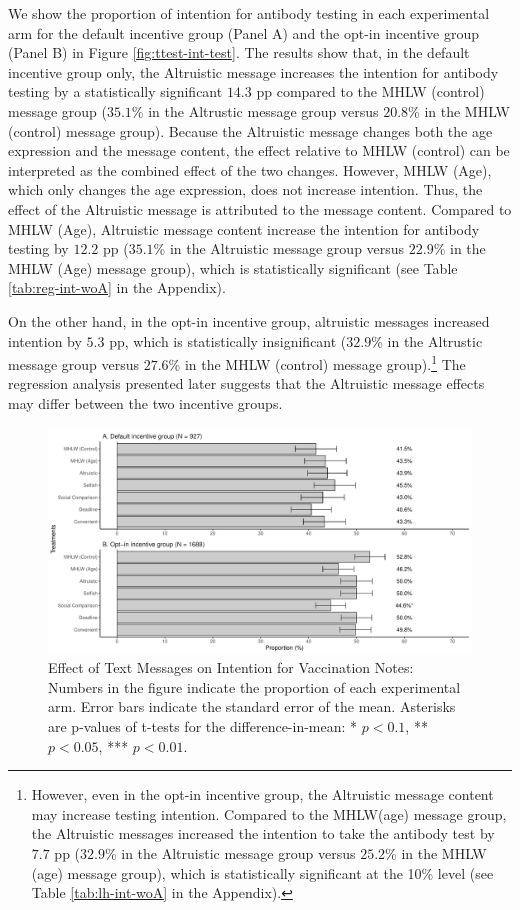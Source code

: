\documentclass[
]{article}
\begin{document}
We show the proportion of intention for antibody testing in each experimental arm for the default incentive group (Panel A) and the opt-in incentive group (Panel B) in Figure \ref{fig:ttest-int-test}. The results show that, in the default incentive group only, the Altruistic message increases the intention for antibody testing by a statistically significant \(14.3\) pp compared to the MHLW (control) message group (\(35.1\)\% in the Altrustic message group versus \(20.8\)\% in the MHLW (control) message group). Because the Altruistic message changes both the age expression and the message content, the effect relative to MHLW (control) can be interpreted as the combined effect of the two changes. However, MHLW (Age), which only changes the age expression, does not increase intention. Thus, the effect of the Altruistic message is attributed to the message content. Compared to MHLW (Age), Altruistic message content increase the intention for antibody testing by \(12.2\) pp (\(35.1\)\% in the Altruistic message group versus \(22.9\)\% in the MHLW (Age) message group), which is statistically significant (see Table \ref{tab:reg-int-woA} in the Appendix).

On the other hand, in the opt-in incentive group, altruistic messages increased intention by \(5.3\) pp, which is statistically insignificant (\(32.9\)\% in the Altrustic message group versus \(27.6\)\% in the MHLW (control) message group).\footnote{However, even in the opt-in incentive group, the Altruistic message content may increase testing intention. Compared to the MHLW(age) message group, the Altruistic messages increased the intention to take the antibody test by \(7.7\) pp (\(32.9\)\% in the Altruistic message group versus \(25.2\)\% in the MHLW (age) message group), which is statistically significant at the 10\% level (see Table \ref{tab:lh-int-woA} in the Appendix).} The regression analysis presented later suggests that the Altruistic message effects may differ between the two incentive groups.

\begin{figure}[t]
\includegraphics{discussion-paper_files/figure-latex/ttest-int-vacc-1} \caption{Effect of Text Messages on Intention for Vaccination Notes: Numbers in the figure indicate the proportion of each experimental arm. Error bars indicate the standard error of the mean. Asterisks are p-values of t-tests for the difference-in-mean: * $p < 0.1$, ** $p < 0.05$, *** $p < 0.01$.}\label{fig:ttest-int-vacc}
\end{figure}
\end{document}

